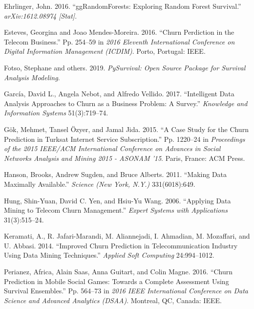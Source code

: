 \documentclass[
  12pt,
]{article}
\newlength{\cslhangindent}
\newlength{\cslentryspacingunit} %
\newenvironment{CSLReferences}[2] %
 {%
  \setlength{\parindent}{0pt}
  \ifodd #1
  \let\oldpar\par
  \def\par{\hangindent=\cslhangindent\oldpar}
  \fi
  \setlength{\parskip}{#2\cslentryspacingunit}
 }%
 {}
\begin{document}
\begin{CSLReferences}{1}{0}
\leavevmode{}%
Ehrlinger, John. 2016. {``ggRandomForests: Exploring Random Forest Survival.''} \emph{arXiv:1612.08974 {[}Stat{]}}.

\leavevmode{}%
Esteves, Georgina and Joao Mendes-Moreira. 2016. {``Churn Perdiction in the Telecom Business.''} Pp. 254--59 in \emph{2016 {Eleventh} {International} {Conference} on {Digital} {Information} {Management} ({ICDIM})}. Porto, Portugal: IEEE.

\leavevmode{}%
Fotso, Stephane and others. 2019. \emph{PySurvival: Open Source Package for Survival Analysis Modeling}.

\leavevmode{}%
García, David L., Angela Nebot, and Alfredo Vellido. 2017. {``Intelligent Data Analysis Approaches to Churn as a Business Problem: A Survey.''} \emph{Knowledge and Information Systems} 51(3):719--74.

\leavevmode{}%
Gök, Mehmet, Tansel Özyer, and Jamal Jida. 2015. {``A {Case} {Study} for the {Churn} {Prediction} in {Turksat} {Internet} {Service} {Subscription}.''} Pp. 1220--24 in \emph{Proceedings of the 2015 {IEEE}/{ACM} {International} {Conference} on {Advances} in {Social} {Networks} {Analysis} and {Mining} 2015 - {ASONAM} '15}. Paris, France: ACM Press.

\leavevmode{}%
Hanson, Brooks, Andrew Sugden, and Bruce Alberts. 2011. {``Making Data Maximally Available.''} \emph{Science (New York, N.Y.)} 331(6018):649.

\leavevmode{}%
Hung, Shin-Yuan, David C. Yen, and Hsiu-Yu Wang. 2006. {``Applying Data Mining to Telecom Churn Management.''} \emph{Expert Systems with Applications} 31(3):515--24.

\leavevmode{}%
Keramati, A., R. Jafari-Marandi, M. Aliannejadi, I. Ahmadian, M. Mozaffari, and U. Abbasi. 2014. {``Improved Churn Prediction in Telecommunication Industry Using Data Mining Techniques.''} \emph{Applied Soft Computing} 24:994--1012.

\leavevmode{}%
Perianez, Africa, Alain Saas, Anna Guitart, and Colin Magne. 2016. {``Churn {Prediction} in {Mobile} {Social} {Games}: {Towards} a {Complete} {Assessment} {Using} {Survival} {Ensembles}.''} Pp. 564--73 in \emph{2016 {IEEE} {International} {Conference} on {Data} {Science} and {Advanced} {Analytics} ({DSAA})}. Montreal, QC, Canada: IEEE.


\end{CSLReferences}
\end{document}

